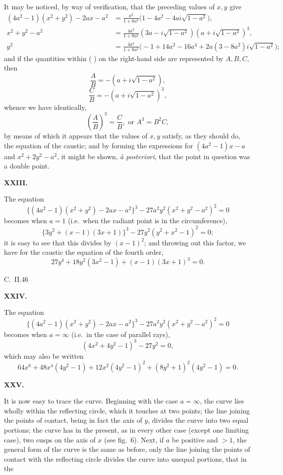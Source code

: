 \documentclass[11pt]{article}
\begin{document}
It may be noticed, by way of verification, that the preceding values of $x,y$ give
\begin{align*}
(4a^2-1)(x^2+y^2) - 2ax - a^2 &= \frac{a^2}{1 + 8a^2}\bigl(1 - 4a^2 - 4ai\sqrt{1-a^2}\bigr), \\
x^2 + y^2 - a^2 &= \frac{4a^2}{1 + 8a^2}(3a - i\sqrt{1-a^2})(a + i\sqrt{1-a^2})^3, \\
y^2 &= \frac{4a^4}{1 + 8a^2}\bigl(-1 + 14a^2 - 16a^4 + 2a(3 - 8a^2) i\sqrt{1-a^2}\bigr);
\end{align*}
and if the quantities within ( ) on the right-hand side are represented by $A,B,C$, then
\[
\frac{A}{B} = -(a + i\sqrt{1-a^2}),
\]
\[
\frac{C}{B} = -(a + i\sqrt{1-a^2})^3,
\]
whence we have identically,
\[
\left(\frac{A}{B}\right)^3 = \frac{C}{B}, \text{ or } A^3 = B^2 C,
\]
by means of which it appears that the values of $x,y$ satisfy, as they should do, the equation of the caustic; and by forming the expressions for $(4a^2-1)x - a$ and $x^2 + 2y^2 - a^2$, it might be shown, \textit{\`a posteriori}, that the point in question was a double point.

\bigskip
\begin{center}\textbf{XXIII.}\end{center}
The equation
\[
\{(4a^2-1)(x^2+y^2) - 2ax - a^2\}^3 - 27 a^2 y^2 (x^2 + y^2 - a^2)^2 = 0
\]
becomes when $a = 1$ (i.e.\ when the radiant point is in the circumference),
\[
\{3y^2 + (x-1)(3x+1)\}^3 - 27 y^2 (y^2 + x^2 - 1)^2 = 0;
\]
it is easy to see that this divides by $(x-1)^2$; and throwing out this factor, we have for the caustic the equation of the fourth order,
\[
27 y^4 + 18 y^2 (3x^2 - 1) + (x-1)(3x+1)^3 = 0.
\]

\hfill C.\ II.\hfill 46

\newpage

\begin{center}\textbf{XXIV.}\end{center}
The equation
\[
\{(4a^2-1)(x^2+y^2) - 2ax - a^2\}^3 - 27 a^2 y^2 (x^2+y^2 - a^2)^2 = 0
\]
becomes when $a = \infty$ (i.e.\ in the case of parallel rays),
\[
(4x^2 + 4y^2 - 1)^3 - 27 y^2 = 0,
\]
which may also be written
\[
64 x^6 + 48 x^4 (4y^2 - 1) + 12 x^2 (4y^2 - 1)^2 + (8y^2 + 1)^2 (4y^2 - 1) = 0.
\]

\bigskip
\begin{center}\textbf{XXV.}\end{center}
It is now easy to trace the curve. Beginning with the case $a = \infty$, the curve lies wholly within the reflecting circle, which it touches at two points; the line joining the points of contact, being in fact the axis of $y$, divides the curve into two equal portions; the curve has in the present, as in every other case (except one limiting case), two cusps on the axis of $x$ (see fig.\ 6). Next, if $a$ be positive and $> 1$, the general form of the curve is the same as before, only the line joining the points of contact with the reflecting circle divides the curve into unequal portions, that in the
\end{document}
